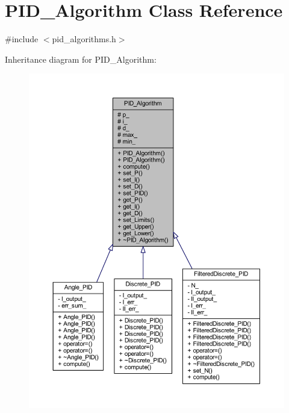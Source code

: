 \hypertarget{class_p_i_d___algorithm}{}\section{P\+I\+D\+\_\+\+Algorithm Class Reference}
\label{class_p_i_d___algorithm}


{\ttfamily \#include $<$pid\+\_\+algorithms.\+h$>$}



Inheritance diagram for P\+I\+D\+\_\+\+Algorithm\+:
\nopagebreak
\begin{figure}[H]
\begin{center}
\leavevmode
\includegraphics[width=350pt]{class_p_i_d___algorithm__inherit__graph}
\end{center}
\end{figure}


